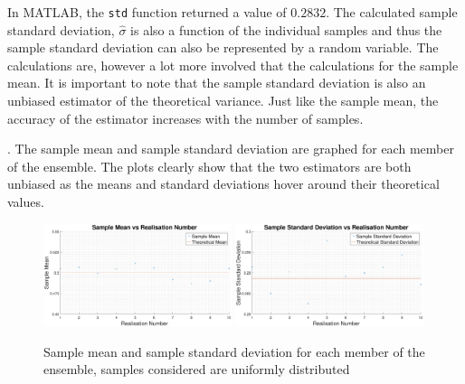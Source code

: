 \documentclass{article}
\begin{document}
In MATLAB, the {\tt std} function returned a value of $0.2832$. The calculated sample standard deviation, $\hat{\sigma}$ is also a function of the individual samples and thus the sample standard deviation can also be represented by a random variable. The calculations are, however a lot more involved that the calculations for the sample mean. It is important to note that the sample standard deviation is also an unbiased estimator of the theoretical variance. Just like the sample mean, the accuracy of the estimator increases with the number of samples.

. The sample mean and sample standard deviation are graphed for each member of the ensemble. The plots clearly show that the two estimators are both unbiased as the means and standard deviations hover around their theoretical values.  
\begin{figure}[H]
\includegraphics[width=0.49\textwidth]{sample_mean_vs_realisation_number_rand}
\includegraphics[width=0.49\textwidth]{sample_standard_deviation_vs_realisation_number_rand}
\caption{Sample mean and sample standard deviation for each member of the ensemble, samples considered are uniformly distributed}
\end{figure}
\end{document}
